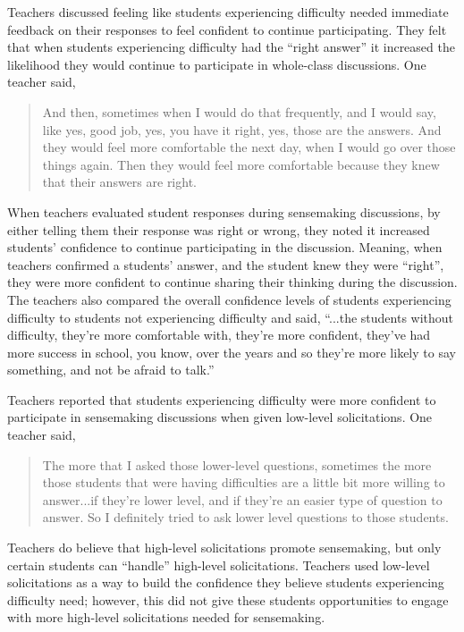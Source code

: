\documentclass{sig-alternate} %
\begin{document}
\begin{large}
Teachers discussed feeling like students experiencing difficulty needed immediate feedback on their responses to feel confident to continue participating. They felt that when students experiencing difficulty had the “right answer” it increased the likelihood they would continue to participate in whole-class discussions. One teacher said, 

\begin{quote}
And then, sometimes when I would do that frequently, and I would say, like yes, good job, yes, you have it right, yes, those are the answers. And they would feel more comfortable the next day, when I would go over those things again. Then they would feel more comfortable because they knew that their answers are right.
\end{quote}

When teachers evaluated student responses during sensemaking discussions, by either telling them their response was right or wrong, they noted it increased students’ confidence to continue participating in the discussion. Meaning, when teachers confirmed a students’ answer, and the student knew they were “right”, they were more confident to continue sharing their thinking during the discussion. The teachers also compared the overall confidence levels of students experiencing difficulty to students not experiencing difficulty and said, “...the students without difficulty, they're more comfortable with, they’re more confident, they’ve had more success in school, you know, over the years and so they’re more likely to say something, and not be afraid to talk.” 
 
Teachers reported that students experiencing difficulty were more confident to participate in sensemaking discussions when given low-level solicitations. One teacher said, 

\begin{quote}
The more that I asked those lower-level questions, sometimes the more those students that were having difficulties are a little bit more willing to answer...if they're lower level, and if they're an easier type of question to answer. So I definitely tried to ask lower level questions to those students. 
\end{quote}

Teachers do believe that high-level solicitations promote sensemaking, but only certain students can “handle” high-level solicitations. Teachers used low-level solicitations as a way to build the confidence they believe students experiencing difficulty need; however, this did not give these students opportunities to engage with more high-level solicitations needed for sensemaking.


\end{large}
\end{document}
